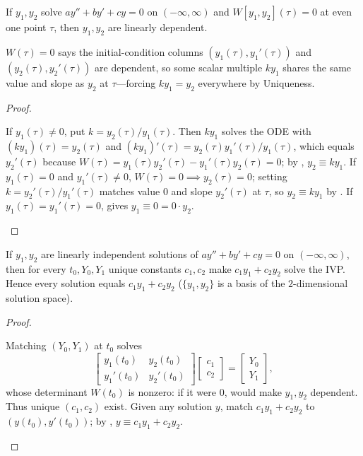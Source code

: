 \documentclass[10pt]{scrartcl}
\begin{document}
\begin{theorem*}
  If $y_1,y_2$ solve $ay''+by'+cy=0$ on $(-\infty,\infty)$ and $W[y_1,y_2](\tau)=0$ at even one point $\tau$, then $y_1,y_2$ are linearly dependent.
\end{theorem*}
\begin{ideabox}
  $W(\tau)=0$ says the initial-condition columns $(y_1(\tau),y_1'(\tau))$ and $(y_2(\tau),y_2'(\tau))$ are dependent, so some scalar multiple $ky_1$ shares the same value and slope as $y_2$ at $\tau$---forcing $ky_1=y_2$ everywhere by Uniqueness.
\end{ideabox}
\begin{proof}
  \begin{steps}
    \ii If $y_1(\tau)\neq 0$, put $k=y_2(\tau)/y_1(\tau)$. Then $ky_1$ solves the ODE with $(ky_1)(\tau)=y_2(\tau)$ and $(ky_1)'(\tau)=y_2(\tau)y_1'(\tau)/y_1(\tau)$, which equals $y_2'(\tau)$ because $W(\tau)=y_1(\tau)y_2'(\tau)-y_1'(\tau)y_2(\tau)=0$; by , $y_2\equiv ky_1$.
    \ii If $y_1(\tau)=0$ and $y_1'(\tau)\neq 0$, $W(\tau)=0\implies y_2(\tau)=0$; setting $k=y_2'(\tau)/y_1'(\tau)$ matches value $0$ and slope $y_2'(\tau)$ at $\tau$, so $y_2\equiv ky_1$ by .
    \ii If $y_1(\tau)=y_1'(\tau)=0$,  gives $y_1\equiv 0 = 0\cdot y_2$. \qedhere
  \end{steps}
\end{proof}

\begin{theorem*}
  If $y_1,y_2$ are linearly independent solutions of $ay''+by'+cy=0$ on $(-\infty,\infty)$, then for every $t_0,Y_0,Y_1$ unique constants $c_1,c_2$ make $c_1y_1+c_2y_2$ solve the IVP. Hence every solution equals $c_1y_1+c_2y_2$ ($\{y_1,y_2\}$ is a basis of the $2$-dimensional solution space).
\end{theorem*}
\begin{proof}
  \begin{steps}
    \ii Matching $(Y_0,Y_1)$ at $t_0$ solves
    \[
      \begin{bmatrix}y_1(t_0)&y_2(t_0)\\y_1'(t_0)&y_2'(t_0)\end{bmatrix}\begin{bmatrix}c_1\\c_2\end{bmatrix}=\begin{bmatrix}Y_0\\Y_1\end{bmatrix},
    \]
    whose determinant $W(t_0)$ is nonzero: if it were $0$,  would make $y_1,y_2$ dependent. Thus unique $(c_1,c_2)$ exist.
    \ii Given any solution $y$, match $c_1y_1+c_2y_2$ to $(y(t_0),y'(t_0))$; by , $y\equiv c_1y_1+c_2y_2$. \qedhere
  \end{steps}
\end{proof}
\end{document}

